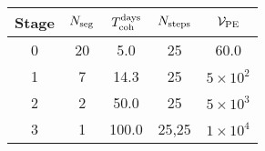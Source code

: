 \begin{tabular}{c|cccc}
Stage & $N_{\rm seg}$ & $T_{\rm coh}^{\rm days}$ &$N_{\rm steps}$ & $\mathcal{V}_{\rm PE}$ \\ \hline
0 & 20 & 5.0 & 25 & 60.0 \\
1 & 7 & 14.3 & 25 & $5{\times}10^{2}$ \\
2 & 2 & 50.0 & 25 & $5{\times}10^{3}$ \\
3 & 1 & 100.0 & 25,25 & $1{\times}10^{4}$ \\
\end{tabular}
